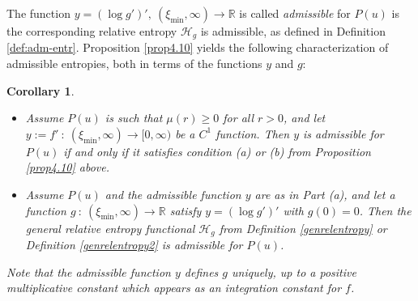 \documentclass[reqno]{amsart}
\newtheorem{corollary}[lemma]{Corollary}
\newcommand{\R}{\mathbb{R}}
\begin{document}
%
The function $y=(\log g')',\:(\xi_{\min},\infty)\to\R$ is called \emph{admissible} for $P(u)$ is the corresponding relative entropy $\mathcal H_g$ is admissible, as defined in Definition \ref{def:adm-entr}. 
Proposition \ref{prop4.10} yields the following characterization of admissible entropies, both in terms of the functions $y$ and $g$: 
%
\begin{corollary}\label{adm-entr}\
\begin{itemize}
    \item[(a)] 
    Assume $P(u)$ is such that $\mu(r)\ge0$ for all $r>0$, and let $y:=f'\: :\: (\xi_{\min},\infty)\to [0,\infty)$ be a $C^1$ function. Then $y$ is \emph{admissible for $P(u)$} if and only if it satisfies condition (a) or (b) from Proposition \ref{prop4.10} above. 
        
    \item[(b)] Assume $P(u)$ and the admissible function $y$ are as in Part (a), and let a function $g\: :\: (\xi_{\min},\infty)\to \R$ satisfy $y=(\log g')'$ with $g(0)=0$. Then the general relative entropy functional $\mathcal H_g$ from Definition \ref{genrelentropy} or Definition \ref{genrelentropy2} is \emph{admissible for $P(u)$}.
\end{itemize}
    Note that the admissible function $y$ defines $g$ uniquely, up to a positive multiplicative constant which appears as an integration constant for $f$.
\end{corollary}
\end{document}
